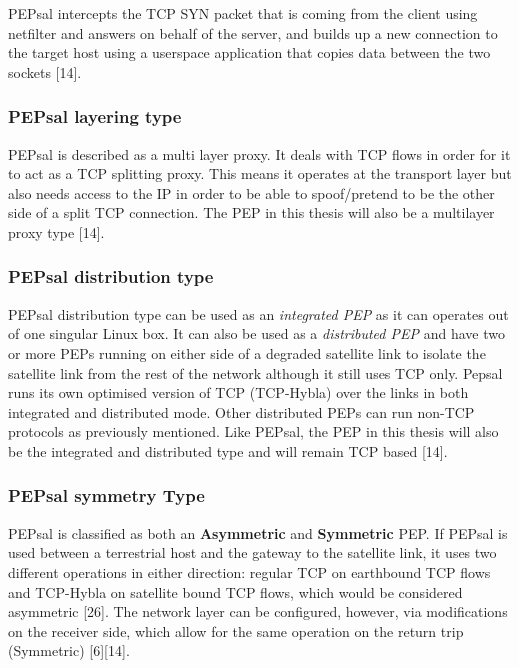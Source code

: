 \documentclass{uathesis}
\begin{document}
PEPsal intercepts the TCP SYN packet that is coming from the client using netfilter and answers on behalf of the server, and builds up a new connection to the target host using a userspace application that copies data between the two sockets [14].\\

\subsubsection*{PEPsal layering type}
PEPsal is described as a multi layer proxy. It deals with TCP flows in order for it to act as a TCP splitting proxy. This means it operates at the transport layer but also needs access to the IP in order to be able to spoof/pretend to be the other side of a split TCP connection. The PEP in this thesis will also be a multilayer proxy type [14].\\

\subsubsection*{PEPsal distribution type}
PEPsal distribution type can be used as an \emph{integrated PEP} as it can operates out of one singular Linux box. It can also be used as a \emph{distributed PEP} and have two or more PEPs running on either side of a degraded satellite link to isolate the satellite link from the rest of the network although it still uses TCP only. Pepsal runs its own optimised version of TCP (TCP-Hybla) over the links in both integrated and distributed mode. Other distributed PEPs can run non-TCP protocols as previously mentioned. Like PEPsal, the PEP in this thesis will also be the integrated and distributed type and will remain TCP based [14]. \\

\subsubsection*{PEPsal symmetry Type}
PEPsal is classified as both an \textbf{Asymmetric} and \textbf{Symmetric} PEP. If PEPsal is used between a terrestrial host and the gateway to the satellite link, it uses two different operations in either direction: regular TCP on earthbound TCP flows and TCP-Hybla on satellite bound TCP flows, which would be considered asymmetric [26]. The network layer can be configured, however, via modifications on the receiver side, which allow for the same operation on the return trip (Symmetric) [6][14].\\
\end{document}
